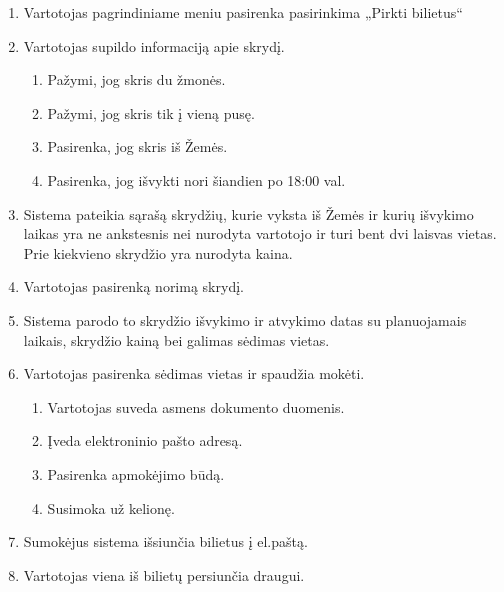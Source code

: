 \documentclass{VUMIFPSkursinis}
\begin{document}
\begin{enumerate}
\item Vartotojas pagrindiniame meniu pasirenka pasirinkima „Pirkti bilietus“
\item Vartotojas supildo informaciją apie skrydį.
\begin{enumerate}[label*=\arabic*.]
\item Pažymi, jog skris du žmonės.
\item Pažymi, jog skris tik į vieną pusę.
\item Pasirenka, jog skris iš Žemės.
\item Pasirenka, jog išvykti nori šiandien po 18:00 val.
\end{enumerate}
\item  Sistema pateikia sąrašą skrydžių, kurie vyksta iš Žemės ir kurių išvykimo laikas yra ne ankstesnis nei nurodyta vartotojo ir turi bent dvi laisvas vietas. Prie kiekvieno skrydžio yra nurodyta kaina.
\item Vartotojas pasirenką norimą skrydį.
\item Sistema parodo to skrydžio išvykimo ir atvykimo datas su planuojamais laikais, skrydžio kainą bei galimas sėdimas vietas.
\item Vartotojas pasirenka sėdimas vietas ir spaudžia mokėti.
\begin{enumerate}[label*=\arabic*.]
\item Vartotojas suveda asmens dokumento duomenis.
\item Įveda elektroninio pašto adresą.
\item Pasirenka apmokėjimo būdą.
\item Susimoka už kelionę.
\end{enumerate}
\item Sumokėjus sistema išsiunčia bilietus į el.paštą.
\item Vartotojas viena iš bilietų persiunčia draugui.
\end{enumerate}
\end{document}
